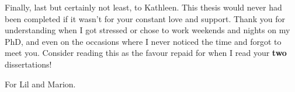\documentclass[10pt,a4paper,twoside]{book}
\begin{document}
Finally, last but certainly not least, to Kathleen.
This thesis would never had been completed if it wasn't for your constant love and support.
Thank you for understanding when I got stressed or chose to work weekends and nights on my PhD, and even on the occasions where I never noticed the time and forgot to meet you.
\noindent Consider reading this as the favour repaid for when I read your \textbf{two} dissertations!

\null\newpage
\null\newpage
\begin{center}
    \vspace*{\fill}
    For Lil and Marion.
    \vspace*{\fill}
\end{center}
\clearpage
\null\newpage

\tableofcontents
\printnoidxglossaries
\newpage

\renewcommand{\cftdotsep}{\cftnodots}%

\listoffigures
{}

\mainmatter











\end{document}
